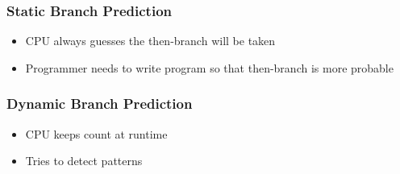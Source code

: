 \begin{frame}
  \frametitle{Static Branch Prediction}
  \begin{itemize}
    \item CPU always guesses the then-branch will be taken
    \item Programmer needs to write program so that then-branch is more probable
  \end{itemize}
  \vskip5mm
  \begin{overprint}

  \end{overprint}
\end{frame}

\begin{frame}
  \frametitle{Dynamic Branch Prediction}
  \begin{itemize}
    \item CPU keeps count at runtime
    \item Tries to detect patterns
  \end{itemize}
  \vskip5mm
  \begin{overprint}

  \end{overprint}
\end{frame}

